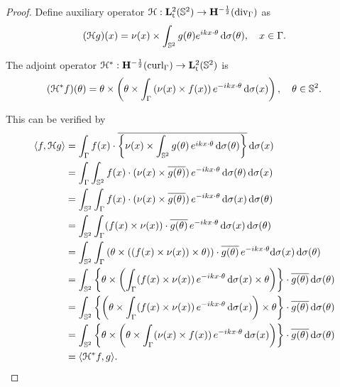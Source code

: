 \begin{proof}
  Define auxiliary operator $\mathcal{H}:{\bf L}^2_\text{t}(\mathbb{S}^2)\rightarrow{\bf H}^{-\frac{1}{2}}(\operatorname{div}_\Gamma)$ as
  \begin{align}
    (\mathcal{H}g)(x)=\nu(x)\times\int_{\mathbb{S}^2}g(\theta)e^{ikx\cdot\theta}\,\text{d}\sigma(\theta),\quad x\in\Gamma.
  \end{align}

  The adjoint operator $\mathcal{H}^*:{\bf H}^{-\frac{1}{2}}(\operatorname{curl}_\Gamma)\rightarrow{\bf L}^2_\text{t}(\mathbb{S}^2)$ is 
  \begin{align}
    (\mathcal{H}^*f)(\theta)=\theta\times\left(\theta\times\int_{\Gamma}\left(\nu(x)\times f(x)\right)e^{-ik x\cdot\theta}\,\text{d}\sigma(x)\right),\quad\theta\in\mathbb{S}^2.
  \end{align}
  
  This can be verified by
  \begin{align*}
    \langle f, \mathcal{H}g\rangle &= \int_{\Gamma}f(x)\cdot\overline{\left\{\nu(x)\times\int_{\mathbb{S}^2}g(\theta)\,e^{i k x\cdot\theta}\,\text{d}\sigma(\theta)\right\}}\,\text{d}\sigma(x) \\
    &=\int_{\Gamma}\int_{\mathbb{S}^2} f(x)\cdot (\nu(x)\times\overline{g(\theta)})\,e^{-i k x\cdot\theta}\,\text{d}\sigma(\theta)\,\text{d}\sigma(x) \\
    &=\int_{\mathbb{S}^2}\int_{\Gamma} f(x)\cdot (\nu(x)\times\overline{g(\theta)})\,e^{-i k x\cdot\theta}\,\text{d}\sigma(x)\,\text{d}\sigma(\theta) \\
    &=\int_{\mathbb{S}^2}\int_{\Gamma}(f(x)\times \nu(x))\cdot\overline{g(\theta)}\,e^{-i k x\cdot\theta}\,\text{d}\sigma(x)\,\text{d}\sigma(\theta) \\
    &=\int_{\mathbb{S}^2}\int_{\Gamma} \left(\theta\times\left((f(x)\times \nu(x))\times\theta\right)\right)\cdot\overline{g(\theta)}\,e^{-i k x\cdot\theta} \text{d}\sigma(x)\,\text{d}\sigma(\theta) \\
    &=\int_{\mathbb{S}^2}\left\{\theta\times\left(\int_{\Gamma} (f(x)\times \nu(x))\,e^{-i k x\cdot\theta}\,\text{d}\sigma(x)\times\theta\right)\right\}\cdot\overline{g(\theta)}\,\text{d}\sigma(\theta) \\
    &=\int_{\mathbb{S}^2}\left\{\left(\theta\times\int_{\Gamma}(f(x)\times \nu(x))\,e^{-i k x\cdot\theta}\,\text{d}\sigma(x)\right)\times\theta\right\}\cdot\overline{g(\theta)}\,\text{d}\sigma(\theta) \\
    &=\int_{\mathbb{S}^2}\left\{\theta\times\left(\theta\times\int_{\Gamma}(\nu(x)\times f(x))\,e^{-i k x\cdot\theta}\,\text{d}\sigma(x)\right)\right\}\cdot\overline{g(\theta)}\,\text{d}\sigma(\theta) \\
    &=\langle\mathcal{H}^*f, g\rangle.
  \end{align*} 


\end{proof}
